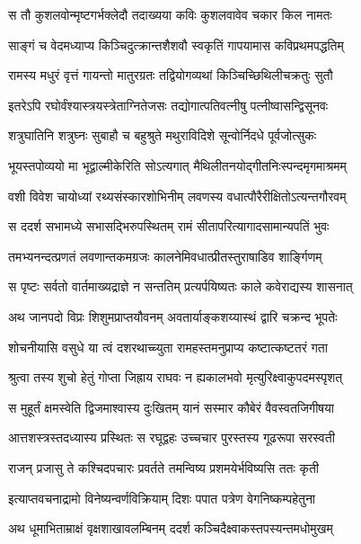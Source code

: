 \twolineshloka
{स तौ कुशलवोन्मृष्टगर्भक्लेदौ तदाख्यया}
{कविः कुशलवावेव चकार किल नामतः} %

\twolineshloka
{साङ्गं च वेदमध्याप्य किञ्चिदुत्क्रान्तशैशवौ}
{स्वकृतिं गापयामास कविप्रथमपद्धतिम्} %

\twolineshloka
{रामस्य मधुरं वृत्तं गायन्तो मातुरग्रतः}
{तद्वियोगव्यथां किञ्चिच्छिथिलीचक्रतुः सुतौ} %

\twolineshloka
{इतरेऽपि रघोर्वंश्यास्त्रयस्त्रेताग्नितेजसः}
{तद्योगात्पतिवत्नीषु पत्नीष्वासन्द्विसूनवः} %

\twolineshloka
{शत्रुघातिनि शत्रुघ्नः सुबाहौ च बहुश्रुते}
{मथुराविदिशे सून्वोर्निदधे पूर्वजोत्सुकः} %

\twolineshloka
{भूयस्तपोव्ययो मा भूद्वाल्मीकेरिति सोऽत्यगात्}
{मैथिलीतनयोद्गीतनिःस्पन्दमृगमाश्रमम्} %

\twolineshloka
{वशी विवेश चायोध्यां रथ्यसंस्कारशोभिनीम्}
{लवणस्य वधात्पौरैरीक्षितोऽत्यन्तगौरवम्} %

\twolineshloka
{स ददर्श सभामध्ये सभासद्भिरुपस्थितम्}
{रामं सीतापरित्यागादसामान्यपतिं भुवः} %

\twolineshloka
{तमभ्यनन्दत्प्रणतं लवणान्तकमग्रजः}
{कालनेमिवधात्प्रीतस्तुराषाडिव शार्ङ्गिणम्} %

\twolineshloka
{स पृष्टः सर्वतो वार्तमाख्यद्राज्ञे न सन्ततिम्}
{प्रत्यर्पयिष्यतः काले कवेराद्यस्य शासनात्} %

\twolineshloka
{अथ जानपदो विप्रः शिशुमप्राप्तयौवनम्}
{अवतार्याङ्कशय्यास्थं द्वारि चक्रन्द भूपतेः} %

\twolineshloka
{शोचनीयासि वसुधे या त्वं दशरथाच्च्युता}
{रामहस्तमनुप्राप्य कष्टात्कष्टतरं गता} %

\twolineshloka
{श्रुत्वा तस्य शुचो हेतुं गोप्ता जिह्राय राघवः}
{न ह्यकालभवो मृत्युरिक्ष्वाकुपदमस्पृशत्} %

\twolineshloka
{स मुहूर्तं क्षमस्वेति द्विजमाश्वास्य दुःखितम्}
{यानं सस्मार कौबेरं वैवस्वतजिगीषया} %

\twolineshloka
{आत्तशस्त्रस्तदध्यास्य प्रस्थितः स रघूद्वहः}
{उच्चचार पुरस्तस्य गूढरूपा सरस्वती} %

\twolineshloka
{राजन् प्रजासु ते कश्चिदपचारः प्रवर्तते}
{तमन्विष्य प्रशमयेर्भविष्यसि ततः कृती} %

\twolineshloka
{इत्याप्तवचनाद्रामो विनेष्यन्वर्णविक्रियाम्}
{दिशः पपात पत्रेण वेगनिष्कम्पहेतुना} %

\twolineshloka
{अथ धूमाभिताम्राक्षं वृक्षशाखावलम्बिनम्}
{ददर्श कञ्चिदैक्ष्वाकस्तपस्यन्तमधोमुखम्} %

